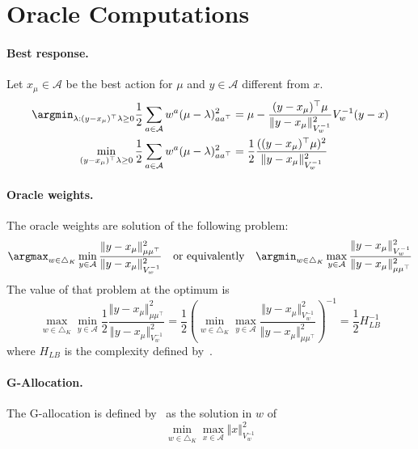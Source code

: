 \section{Oracle Computations}

\paragraph{Best response.}

Let $x_\mu \in \mathcal A$ be the best action for $\mu$ and $y\in \mathcal A$ different from $x$.
\begin{align*}
\argmin_{\lambda:(y-x_\mu)^\top\lambda \ge 0}\frac{1}{2} \sum_{a \in \mathcal A} w^a (\mu - \lambda)^2_{aa^\top}
&= \mu - \frac{(y-x_\mu)^\top \mu}{\Vert y-x_\mu \Vert^2_{V_w^{-1}}} V_w^{-1}(y - x)
\\
\min_{(y-x_\mu)^\top\lambda \ge 0}\frac{1}{2} \sum_{a \in \mathcal A} w^a (\mu - \lambda)^2_{aa^\top}
&= \frac{1}{2} \frac{((y-x_\mu)^\top \mu)^2}{\Vert y-x_\mu \Vert^2_{V_w^{-1}}}
\end{align*}

\paragraph{Oracle weights.}

The oracle weights are solution of the following problem:
\[
\argmax_{w \in \triangle_K} \min_{y \in \mathcal A} \frac{\Vert y-x_\mu \Vert^2_{\mu \mu^\top}}{\Vert y-x_\mu \Vert^2_{V_w^{-1}}} \quad \text{or equivalently} \quad \argmin_{w \in \triangle_K} \max_{y \in \mathcal A} \frac{\Vert y-x_\mu \Vert^2_{V_w^{-1}}}{\Vert y-x_\mu \Vert^2_{\mu \mu^\top}}
\]
The value of that problem at the optimum is
\[
\max_{w \in \triangle_K} \min_{y \in \mathcal A} \frac{1}{2}\frac{\Vert y-x_\mu \Vert^2_{\mu \mu^\top}}{\Vert y-x_\mu \Vert^2_{V_w^{-1}}}
= \frac{1}{2}\left(\min_{w \in \triangle_K} \max_{y \in \mathcal A} \frac{\Vert y-x_\mu \Vert^2_{V_w^{-1}}}{\Vert y-x_\mu \Vert^2_{\mu \mu^\top}}\right)^{-1}
= \frac{1}{2}H_{LB}^{-1}
\]
where $H_{LB}$ is the complexity defined by~\citet{soare2014linear}.

\paragraph{G-Allocation.}
 
 The G-allocation is defined by~\citet{soare2014linear} as the solution in $w$ of
 \[
\min_{w \in \triangle_K} \max_{x \in \mathcal A} \Vert x \Vert^2_{V_w^{-1}}
 \]

